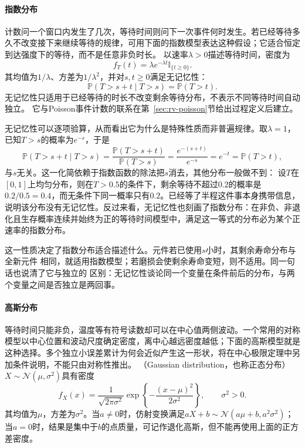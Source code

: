 \paragraph{指数分布}
计数问一个窗口内发生了几次，等待时间则问下一次事件何时发生。若已经等待多久不改变接下来继续等待的规律，可用下面的指数模型表达这种假设；它适合恒定到达强度下的等待，而不是任意非负时长。
以速率\(\lambda>0\)描述等待时间，密度为
\[
f_T(t)=\lambda e^{-\lambda t}\mathbb I_{\{t\geq0\}}.
\]
其均值为\(1/\lambda\)、方差为\(1/\lambda^2\)，并对\(s,t\geq0\)满足无记忆性：
\[ \mathbb{P}(T>s+t\mid T>s)=\mathbb{P}(T>t). \]
无记忆性只适用于已经等待的时长不改变剩余等待分布，不表示不同等待时间自动独立。
它与Poisson事件计数的联系在第~\ref{sec:rv-poisson}节给出过程定义后建立。

无记忆性可以逐项验算，从而看出它为什么是特殊性质而非普遍规律。取\(\lambda=1\)，
已知\(T>s\)的概率为\(e^{-s}\)，于是
\[
  \mathbb{P}(T>s+t\mid T>s)
  =\frac{\mathbb{P}(T>s+t)}{\mathbb{P}(T>s)}
  =\frac{e^{-(s+t)}}{e^{-s}}=e^{-t}
  =\mathbb{P}(T>t),
\]
与\(s\)无关。这一化简依赖于指数函数的除法把\(s\)消去，其他分布一般做不到：
设\(T\)在\([0,1]\)上均匀分布，则在\(T>0.5\)的条件下，剩余等待不超过\(0.2\)的概率是
\(0.2/0.5=0.4\)，而无条件下同一概率只有\(0.2\)。已经等了半程这件事本身携带信息，
说明该分布没有无记忆性。反过来看，无记忆性也刻画了指数分布：在非负、非退化且生存概率连续并始终为正的等待时间模型中，满足这一等式的分布必为某个正速率的指数分布。

这一性质决定了指数分布适合描述什么。元件若已使用\(s\)小时，其剩余寿命分布与全新元件
相同，就适用指数模型；若磨损会使剩余寿命变短，则不适用。同一句话也说清了它与独立的
区别：无记忆性谈论同一个变量在条件前后的分布，与两个变量之间是否独立是两回事。

\paragraph{高斯分布}
等待时间只能非负，温度等有符号读数却可以在中心值两侧波动。一个常用的对称模型以中心位置和波动尺度确定密度，离中心越远密度越低；下面的高斯模型就是这种选择。多个独立小误差累计为何会近似产生这一形状，将在中心极限定理中另加条件说明，不能只由对称性推出。
（Gaussian distribution，也称正态分布）
\(X\sim\mathcal{N}(\mu,\sigma^2)\)具有密度
\[ f_X(x)
  =\frac{1}{\sqrt{2\pi\sigma^2}}\exp\left\{-\frac{(x-\mu)^2}{2\sigma^2}\right\},\qquad \sigma^2>0. \]
其均值为\(\mu\)，方差为\(\sigma^2\)。当\(a\neq0\)时，仿射变换满足\(aX+b\sim\mathcal{N}(a\mu+b,a^2\sigma^2)\)；当\(a=0\)时，结果是集中于\(b\)的点质量，可记作退化高斯，但不能再使用上面的正方差密度。

